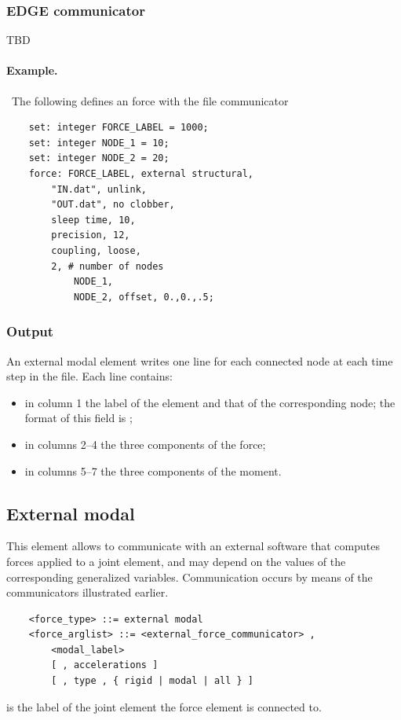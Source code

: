 \subsubsection{EDGE communicator}
TBD

\paragraph{Example.} \
The following defines an  force
with the file communicator
\begin{verbatim}
    set: integer FORCE_LABEL = 1000;
    set: integer NODE_1 = 10;
    set: integer NODE_2 = 20;
    force: FORCE_LABEL, external structural,
        "IN.dat", unlink,
        "OUT.dat", no clobber,
        sleep time, 10,
        precision, 12,
        coupling, loose,
        2, # number of nodes
            NODE_1,
            NODE_2, offset, 0.,0.,.5;
\end{verbatim}

\subsubsection{Output}
An external modal element writes one line for each connected node
at each time step in the \kw{.frc} file.
Each line contains:
\begin{itemize}
\item in column 1 the label of the element and that of the corresponding node;
	the format of this field is \kw{element\_label@node\_label};
\item in columns 2--4 the three components of the force;
\item in columns 5--7 the three components of the moment.
\end{itemize}


\subsection{External modal}
This element allows to communicate with an external software that computes
forces applied to a 
 joint element,
and may depend on the values of the corresponding generalized variables.
Communication occurs by means of the communicators illustrated earlier.
\begin{verbatim}
    <force_type> ::= external modal
    <force_arglist> ::= <external_force_communicator> ,
        <modal_label>
        [ , accelerations ]
        [ , type , { rigid | modal | all } ]
\end{verbatim}
 is the label of the 
 joint element
the force element is connected to.

